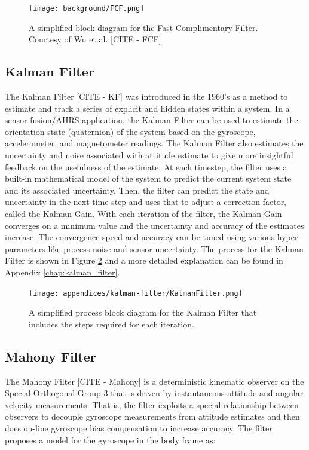 \begin{figure}
    \centering
    \caption[Fast Complimentary Filter]{A simplified block diagram for the Fast Complimentary Filter. 
    Courtesy of Wu et al. [CITE - FCF]}
    \label{fig:fcf_diagram}
    \texttt{[image: background/FCF.png]}
\end{figure}

\subsection{Kalman Filter} \label{ssec:kalman_filter}
The Kalman Filter [CITE - KF] was introduced in the 1960's as a method to estimate and track a series of explicit and hidden states within a system.
In a sensor fusion/AHRS application, the Kalman Filter can be used to estimate the orientation state (quaternion) of the system based on the gyroscope, accelerometer, and magnetometer readings.
The Kalman Filter also estimates the uncertainty and noise associated with attitude estimate to give more insightful feedback on the usefulness of the estimate.
At each timestep, the filter uses a built-in mathematical model of the system to predict the current system state and its associated uncertainty.
Then, the filter can predict the state and uncertainty in the next time step and uses that to adjust a correction factor, called the Kalman Gain.
With each iteration of the filter, the Kalman Gain converges on a minimum value and the uncertainty and accuracy of the estimates increase.
The convergence speed and accuracy can be tuned using various hyper parameters like process noise and sensor uncertainty.
The process for the Kalman Filter is shown in Figure \ref{fig:bkg_kalman_filter_process} and a more detailed explanation can be found in Appendix \ref{chap:kalman_filter}.

\begin{figure}
    \centering
    \caption[Kalman Filter Process]{A simplified process block diagram for the Kalman Filter that includes the steps required for each iteration.}
    \label{fig:bkg_kalman_filter_process}
    \texttt{[image: appendices/kalman-filter/KalmanFilter.png]}
\end{figure}

\subsection{Mahony Filter} \label{ssec:mahony_filter}
The Mahony Filter [CITE - Mahony] is a deterministic kinematic observer on the Special Orthogonal Group 3 that is driven by instantaneous attitude and angular velocity measurements.
That is, the filter exploits a special relationship between observers to decouple gyroscope measurements from attitude estimates and then does on-line gyroscope bias compensation to increase accuracy.
The filter proposes a model for the gyroscope in the body frame as:

